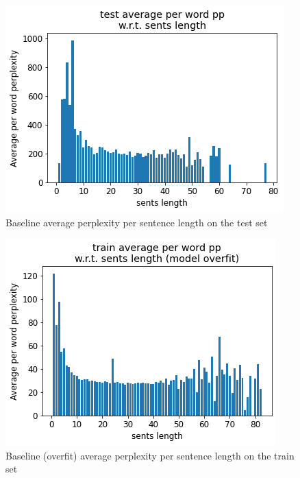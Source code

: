 \begin{figure}[!t]
    \centering
    \includegraphics[scale=0.40]{assets/baseline_test_pp_per_length.png}
    \vspace{-1.0em}
    \caption{Baseline average perplexity per sentence length on the test set}
    \vspace{-1.0em}
    \label{fig:baseline-test-pp}
\end{figure}

\begin{figure}[!t]
    \centering
    \includegraphics[scale=0.40]{assets/overfit_train_pp_per_length.png}
    \vspace{-1.0em}
    \caption{Baseline (overfit) average perplexity per sentence length on the train set}
    \vspace{-1.0em}
    \label{fig:overfit-train-pp}
\end{figure}

